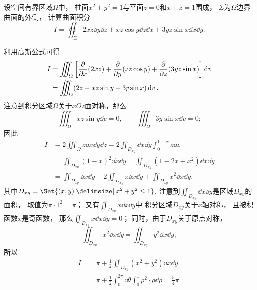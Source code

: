 \begin{example}
设空间有界区域\(\Omega\)中，
柱面\(x^2+y^2=1\)与平面\(z=0\)和\(x+z=1\)围成，
\(\Sigma\)为\(\Omega\)边界曲面的外侧，
计算曲面积分\begin{equation*}
	I = \oiint_\Sigma 2xz \dd{y}\dd{z} + xz \cos y \dd{z}\dd{x} + 3yz \sin x \dd{x}\dd{y}.
\end{equation*}
\begin{solution}
利用高斯公式可得
\begin{align*}
	I &= \iiint_\Omega \left[
			\pdv{x}(2xz)
			+ \pdv{y}(xz \cos y)
			+ \pdv{z}(3yz \sin x)
		\right] \dd{v} \\
	&= \iiint_\Omega (2z - xz \sin y + 3y \sin x) \dd{v}.
\end{align*}
注意到积分区域\(\Omega\)关于\(xOz\)面对称，那么\begin{equation*}
	\iiint_\Omega xz \sin y \dd{v} = 0,
	\qquad
	\iiint_\Omega 3y \sin x \dd{v} = 0;
\end{equation*}
因此\begin{align*}
	I &= 2 \iiint_\Omega z \dd{x}\dd{y}\dd{z}
	= 2 \iint_{D_{xy}} \dd{x}\dd{y} \int_0^{1-x} z \dd{z} \\
	&= \iint_{D_{xy}} (1-x)^2 \dd{x}\dd{y}
	= \iint_{D_{xy}} (1-2x+x^2) \dd{x}\dd{y} \\
	&= \iint_{D_{xy}} \dd{x}\dd{y}
	- 2 \iint_{D_{xy}} x \dd{x}\dd{y}
	+ \iint_{D_{xy}} x^2 \dd{x}\dd{y},
\end{align*}
其中\(D_{xy} = \Set{(x,y) \given x^2+y^2\leq1}\).
注意到\(\iint_{D_{xy}} \dd{x}\dd{y}\)是区域\(D_{xy}\)的面积，
取值为\(\pi\cdot1^2=\pi\)；
又有\(\iint_{D_{xy}} x \dd{x}\dd{y}\)中
积分区域\(D_{xy}\)关于\(x\)轴对称，
且被积函数\(x\)是奇函数，
那么\(\iint_{D_{xy}} x \dd{x}\dd{y} = 0\)；
同时，由于\(D_{xy}\)关于原点对称，\begin{equation*}
	\iint_{D_{xy}} x^2 \dd{x}\dd{y} = \iint_{D_{xy}} y^2 \dd{x}\dd{y},
\end{equation*}
所以\begin{align*}
	I &= \pi + \frac{1}{2} \iint_{D_{xy}} (x^2+y^2) \dd{x}\dd{y} \\
	&= \pi + \frac{1}{2}
		\int_0^{2\pi} \dd{\theta} \int_0^1 \rho^2 \cdot \rho\dd{\rho}
	= \frac{5}{4} \pi.
\end{align*}
\end{solution}
\end{example}

